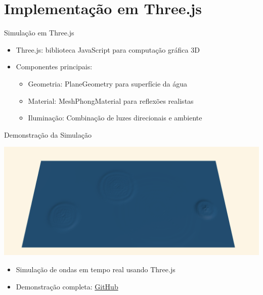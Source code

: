 \documentclass[aspectratio=169,xcolor=table]{beamer}
\begin{document}
\section{Implementação em Three.js}
\begin{frame}{Simulação em Three.js}
    \begin{itemize}
        \item Three.js: biblioteca JavaScript para computação gráfica 3D \cite{threejs2024}
        \item Componentes principais:
        \begin{itemize}
            \item Geometria: PlaneGeometry para superfície da água
            \item Material: MeshPhongMaterial para reflexões realistas
            \item Iluminação: Combinação de luzes direcionais e ambiente
        \end{itemize}
    \end{itemize}
\end{frame}

\begin{frame}{Demonstração da Simulação}
    \begin{center}
        \includegraphics[height=0.35\textheight]{imgs/wave.png}
    \end{center}
    
    \begin{itemize}
        \item Simulação de ondas em tempo real usando Three.js
        \item Demonstração completa: \href{https://github.com/alephoverflow/WaveSimulator}{GitHub}
    \end{itemize}
\end{frame}
\end{document}
